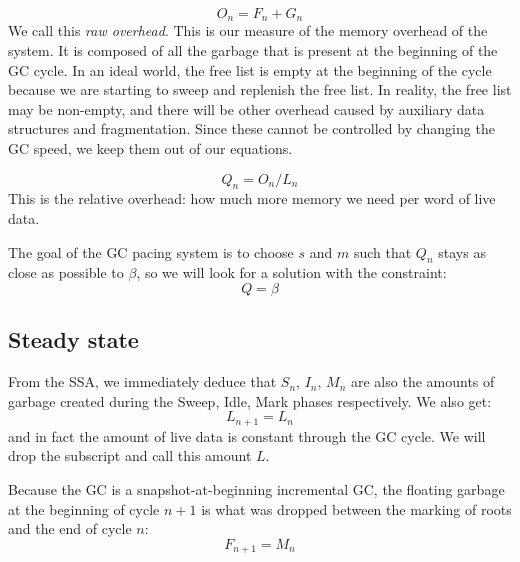 \documentclass{article}
\begin{document}
\begin{equation}\label{def-O}
O_n = F_n + G_n
\end{equation}
We call this \emph{raw overhead}. This is our measure of the memory
overhead of the system. It is
composed of all the garbage that is present at the  beginning of the
GC cycle. In an ideal world, the free list is empty at the beginning
of the cycle because we are starting to sweep and replenish the free
list. In reality, the free list may be non-empty, and there will be
other overhead caused by auxiliary data structures and
fragmentation. Since these cannot be controlled by changing the GC
speed, we keep them out of our equations.


\begin{equation}\label{def-Q}
Q_n = O_n/L_n
\end{equation}
This is the relative overhead: how much more memory we need per word
of live data.

The goal of the GC pacing system is to choose $s$ and $m$ such that
$Q_n$ stays as close as possible to $\beta$, so we will look for a
solution with the constraint:
\begin{equation}\label{beta-Q}
Q = \beta
\end{equation}

\subsection{Steady state}

From the SSA, we immediately deduce that $S_n$, $I_n$, $M_n$ are also
the amounts of garbage created during the Sweep, Idle, Mark phases
respectively. We also get:
\begin{equation}
  L_{n+1} = L_n
\end{equation}
and in fact the amount of live data is constant through the GC
cycle. We will drop the subscript and call this amount $L$.

Because the GC is a snapshot-at-beginning incremental GC, the floating
garbage at the beginning of cycle $n+1$ is what was dropped between
the marking of roots and the end of cycle $n$:
\begin{equation}\label{eqn-F}
  F_{n+1} = M_n
\end{equation}
\end{document}
